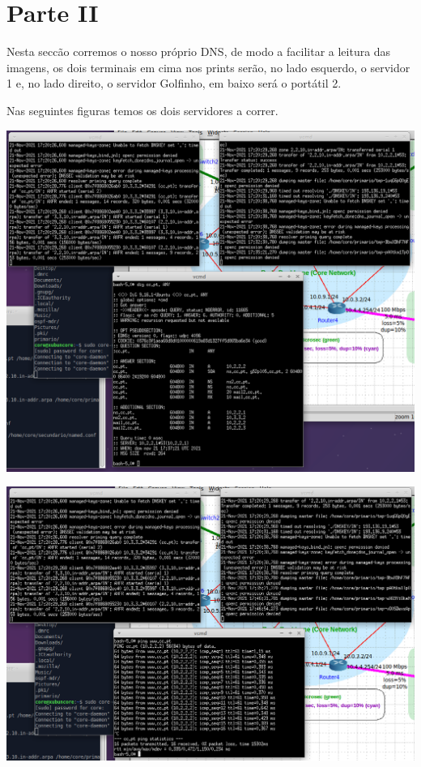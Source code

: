 \documentclass{report}
\begin{document}
    \section*{Parte II}
	Nesta seccão corremos o nosso próprio DNS, de modo a facilitar a leitura das imagens, os dois terminais em cima nos prints serão, no lado esquerdo, o servidor 1 e, no lado direito, o servidor Golfinho, em baixo será o portátil 2.

	Nas seguintes figuras temos os dois servidores a correr.
	\vspace{0.45em}
 	\par
	\noindent
        \includegraphics[width=\textwidth]{images/digambos.png}
        \par
	\vspace{0.45em}
 	\par
	\noindent
        \includegraphics[width=\textwidth]{images/pingambos.png}
\end{document}
